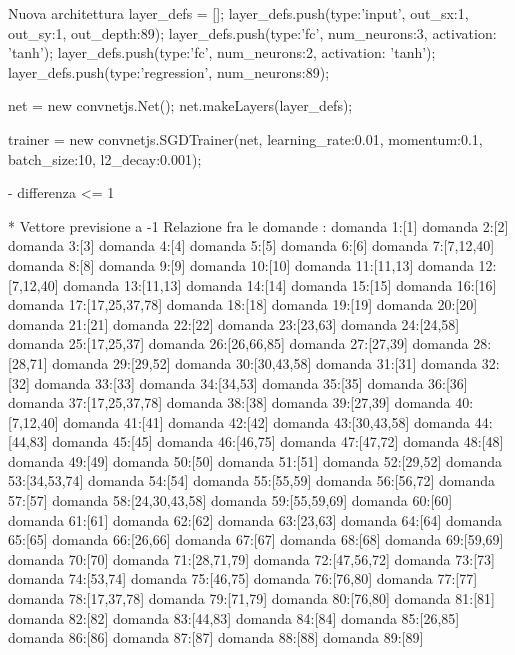 Nuova architettura
layer_defs = [];
layer_defs.push({type:'input', out_sx:1, out_sy:1, out_depth:89});
layer_defs.push({type:'fc', num_neurons:3, activation: 'tanh'});
layer_defs.push({type:'fc', num_neurons:2, activation: 'tanh'});
layer_defs.push({type:'regression', num_neurons:89});

net = new convnetjs.Net();
net.makeLayers(layer_defs);

trainer = new convnetjs.SGDTrainer(net, {learning_rate:0.01, momentum:0.1, batch_size:10, l2_decay:0.001});

- differenza <= 1

* Vettore previsione a -1
Relazione fra le domande :
domanda 1:[1]
domanda 2:[2]
domanda 3:[3]
domanda 4:[4]
domanda 5:[5]
domanda 6:[6]
domanda 7:[7,12,40]
domanda 8:[8]
domanda 9:[9]
domanda 10:[10]
domanda 11:[11,13]
domanda 12:[7,12,40]
domanda 13:[11,13]
domanda 14:[14]
domanda 15:[15]
domanda 16:[16]
domanda 17:[17,25,37,78]
domanda 18:[18]
domanda 19:[19]
domanda 20:[20]
domanda 21:[21]
domanda 22:[22]
domanda 23:[23,63]
domanda 24:[24,58]
domanda 25:[17,25,37]
domanda 26:[26,66,85]
domanda 27:[27,39]
domanda 28:[28,71]
domanda 29:[29,52]
domanda 30:[30,43,58]
domanda 31:[31]
domanda 32:[32]
domanda 33:[33]
domanda 34:[34,53]
domanda 35:[35]
domanda 36:[36]
domanda 37:[17,25,37,78]
domanda 38:[38]
domanda 39:[27,39]
domanda 40:[7,12,40]
domanda 41:[41]
domanda 42:[42]
domanda 43:[30,43,58]
domanda 44:[44,83]
domanda 45:[45]
domanda 46:[46,75]
domanda 47:[47,72]
domanda 48:[48]
domanda 49:[49]
domanda 50:[50]
domanda 51:[51]
domanda 52:[29,52]
domanda 53:[34,53,74]
domanda 54:[54]
domanda 55:[55,59]
domanda 56:[56,72]
domanda 57:[57]
domanda 58:[24,30,43,58]
domanda 59:[55,59,69]
domanda 60:[60]
domanda 61:[61]
domanda 62:[62]
domanda 63:[23,63]
domanda 64:[64]
domanda 65:[65]
domanda 66:[26,66]
domanda 67:[67]
domanda 68:[68]
domanda 69:[59,69]
domanda 70:[70]
domanda 71:[28,71,79]
domanda 72:[47,56,72]
domanda 73:[73]
domanda 74:[53,74]
domanda 75:[46,75]
domanda 76:[76,80]
domanda 77:[77]
domanda 78:[17,37,78]
domanda 79:[71,79]
domanda 80:[76,80]
domanda 81:[81]
domanda 82:[82]
domanda 83:[44,83]
domanda 84:[84]
domanda 85:[26,85]
domanda 86:[86]
domanda 87:[87]
domanda 88:[88]
domanda 89:[89]

